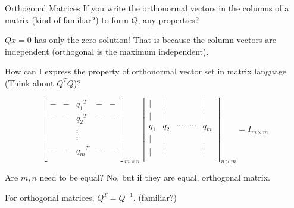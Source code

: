 \documentclass{beamer}
\begin{document}
\begin{frame}{Orthogonal Matrices}
If you write the orthonormal vectors in the columns of a matrix (kind of familiar?) to form $Q$, any properties?

\vspace{3pt}
$Qx=0$ has only the zero solution! That is because the column vectors are independent (orthogonal is the maximum independent).

\vspace{3pt}
How can I express the property of orthonormal vector set in matrix language (Think about $Q^TQ$)?


\begin{equation*}
    \left[ \begin{matrix}
        -&		-&		{q_1}^T&		-&		-\\
        -&		-&		{q_2}^T&		-&		-\\
        &		&		\vdots&		&		\\
        &		&		\vdots&		&		\\
        -&		-&		{q_m}^T&		-&		-\\
    \end{matrix} \right] _{m\times n}\left[ \begin{matrix}
        |&		|&		&		&		|\\
        |&		|&		&		&		|\\
        q_1&		q_2&		\cdots&		\cdots&		q_m\\
        |&		|&		&		&		|\\
        |&		|&		&		&		|\\
    \end{matrix} \right] _{n\times m}=I _{m\times m}
\end{equation*}

Are $m,n$ need to be equal? No, but if they are equal, orthogonal matrix.

\vspace{3pt}
For orthogonal matrices, $Q^T=Q^{-1}$. (familiar?)
\end{frame}
\end{document}
